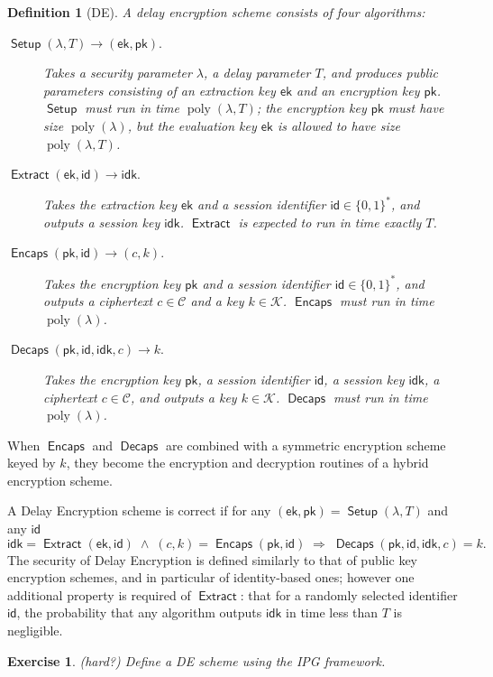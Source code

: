 \documentclass{article}
\newtheorem{ex}{Exercise}
\newtheorem{defi}{Definition}
\newcommand{\ek}{\mathsf{ek}}
\newcommand{\pk}{\mathsf{pk}}
\newcommand{\id}{\mathsf{id}}
\newcommand{\idk}{\mathsf{idk}}
\DeclareMathOperator{\poly}{poly}
\DeclareMathOperator{\Setup}{\mathsf{Setup}}
\DeclareMathOperator{\Extract}{\mathsf{Extract}}
\DeclareMathOperator{\Encaps}{\mathsf{Encaps}}
\DeclareMathOperator{\Decaps}{\mathsf{Decaps}}
\newcommand{\keyspace}{\mathcal{K}}
\newcommand{\cipherspace}{\mathcal{C}}
\begin{document}
\begin{defi}[DE]
  A \emph{delay encryption} scheme consists of four algorithms:
  \begin{description}
  \item[$\Setup(\lambda, T) \to (\ek,\pk)$.] %
    Takes a \emph{security parameter} $\lambda$, a \emph{delay
      parameter} $T$, and produces public parameters consisting of an
    \emph{extraction key} $\ek$ and an \emph{encryption key} $\pk$. %
    $\Setup$ must run in time $\poly(\lambda,T)$; the encryption key
    $\pk$ must have size $\poly(\lambda)$, but the evaluation key $\ek$
    is allowed to have size $\poly(\lambda,T)$.
  \item[$\Extract(\ek,\id) \to \idk$.] %
    Takes the extraction key $\ek$ and a \emph{session identifier}
    $\id\in\{0,1\}^*$, and outputs a \emph{session key} $\idk$. %
    $\Extract$ is expected to run in time \emph{exactly} $T$.
  \item[$\Encaps(\pk,\id)\to (c,k)$.] %
    Takes the encryption key $\pk$ and a \emph{session identifier}
    $\id\in\{0,1\}^*$, and outputs a \emph{ciphertext}
    $c\in\cipherspace$ and a \emph{key} $k\in\keyspace$. %
    $\Encaps$ must run in time $\poly(\lambda)$.
  \item[$\Decaps(\pk,\id,\idk,c)\to k$.] %
    Takes the encryption key $\pk$, a \emph{session identifier}
    $\id$, a \emph{session key} $\idk$, a ciphertext $c\in\cipherspace$,
    and outputs a key $k\in\keyspace$. %
    $\Decaps$ must run in time $\poly(\lambda)$.
  \end{description}
\end{defi}

When $\Encaps$ and $\Decaps$ are combined with a symmetric encryption
scheme keyed by $k$, they become the encryption and decryption
routines of a hybrid encryption scheme.

A Delay Encryption scheme is correct if for any
$(\ek,\pk)=\Setup(\lambda,T)$ and any $\id$
\[\idk=\Extract(\ek,\id)
  \;\wedge\;
  (c,k) = \Encaps(\pk,\id)
  \;\Rightarrow\;
  \Decaps(\pk,\id,\idk,c) = k.\]
The security of Delay Encryption is defined similarly to that of
public key encryption schemes, and in particular of identity-based
ones; however one additional property is required of $\Extract$: that
for a randomly selected identifier $\id$, the probability that any
algorithm outputs $\idk$ in time less than $T$ is negligible. %


\begin{ex}(hard?)
  Define a DE scheme using the IPG framework.
\end{ex}
\end{document}
